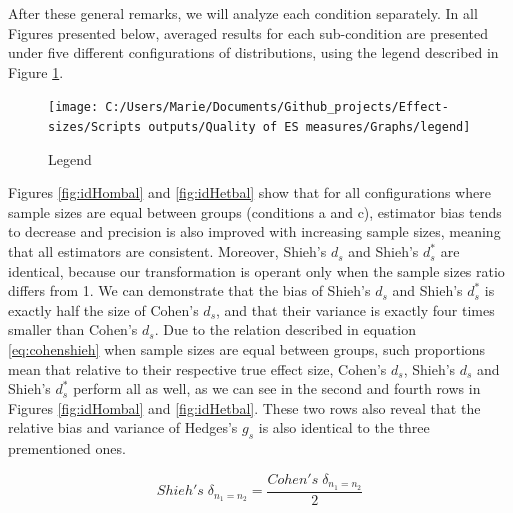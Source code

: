 \documentclass[
  man,floatsintext]{apa6}
\begin{document}
After these general remarks, we will analyze each condition separately. In all Figures presented below, averaged results for each sub-condition are presented under five different configurations of distributions, using the legend described in Figure \ref{fig:legend}.

\begin{figure}
\texttt{[image: C:/Users/Marie/Documents/Github\_projects/Effect-sizes/Scripts outputs/Quality of ES measures/Graphs/legend]} \caption{Legend}\label{fig:legend}
\end{figure}

Figures \ref{fig:idHombal} and \ref{fig:idHetbal} show that for all configurations where sample sizes are equal between groups (conditions a and c), estimator bias tends to decrease and precision is also improved with increasing sample sizes, meaning that all estimators are consistent. Moreover, Shieh's \(d_s\) and Shieh's \(d^*_s\) are identical, because our transformation is operant only when the sample sizes ratio differs from 1. We can demonstrate that the bias of Shieh's \(d_s\) and Shieh's \(d_s^*\) is exactly half the size of Cohen's \(d_s\), and that their variance is exactly four times smaller than Cohen's \(d_s\). Due to the relation described in equation \ref{eq:cohenshieh} when sample sizes are equal between groups, such proportions mean that relative to their respective true effect size, Cohen's \(d_s\), Shieh's \(d_s\) and Shieh's \(d^*_s\) perform all as well, as we can see in the second and fourth rows in Figures \ref{fig:idHombal} and \ref{fig:idHetbal}. These two rows also reveal that the relative bias and variance of Hedges's \(g_s\) is also identical to the three prementioned ones.

\begin{equation} 
Shieh's \; \delta_{n_1=n_2}= \frac{Cohen's \; \delta_{n_1=n_2}}{2}
\label{eq:cohenshieh}
\end{equation}
\end{document}

